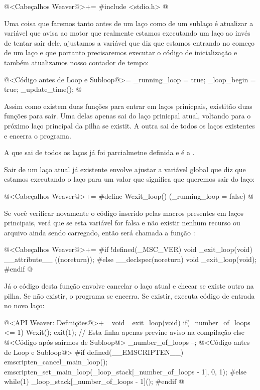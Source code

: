 @<Cabeçalhos Weaver@>+=
#include <stdio.h>
@

Uma coisa que faremos tanto antes de um laço como de um sublaço é
atualizar a variável  que avisa ao motor
que realmente estamos executando um laço ao invés de tentar sair dele,
ajustamos a variável que diz que estamos entrando no começo de um laço
e que portanto precisaremos executar o código de inicialização e
também atualizamos nosso contador de tempo:

\iniciocodigo
@<Código antes de Loop e Subloop@>=
_running_loop = true;
_loop_begin = true;
_update_time();
@
\fimcodigo


Assim como existem duas funções para entrar em laços prinicpais,
existitão duas funções para sair. Uma delas apenas sai do laço
prinicpal atual, voltando para o próximo laço principal da pilha se
existit. A outra sai de todos os laços existentes e encerra o
programa.

A que sai de todos os laços já foi parcialmetne definida e é
a .

Sair de um laço atual já existente envolve ajustar a variável global
que diz que estamos executando o laço para um valor que significa que
queremos sair do laço:

\iniciocodigo
@<Cabeçalhos Weaver@>+=
#define Wexit_loop() (_running_loop = false)
@
\fimcodigo

Se você verificar novamente o código inserido pelas macros presentes
em laços principais, verá que se esta variável for falsa e não existir
nenhum recurso ou arquivo ainda sendo carregado, então será chamada a
função :

\iniciocodigo
@<Cabeçalhos Weaver@>+=
#if !defined(_MSC_VER)
void _exit_loop(void) __attribute__ ((noreturn));
#else
__declspec(noreturn) void _exit_loop(void);
#endif
@
\fimcodigo

Já o código desta função envolve cancelar o laço atual e checar se
existe outro na pilha. Se não existir, o programa se encerra. Se
existir, executa código de entrada no novo laço:

\iniciocodigo
@<API Weaver: Definições@>+=
void _exit_loop(void){
  if(_number_of_loops <= 1){
    Wexit();
    exit(1); // Esta linha apenas previne aviso na compilação
  }
  else{
    @<Código após sairmos de Subloop@>
    _number_of_loops --;
    @<Código antes de Loop e Subloop@>
#if defined(__EMSCRIPTEN__)
    emscripten_cancel_main_loop();
    emscripten_set_main_loop(_loop_stack[_number_of_loops - 1], 0, 1);
#else
    while(1)
      _loop_stack[_number_of_loops - 1]();
#endif
  }
}
@
\fimcodigo

